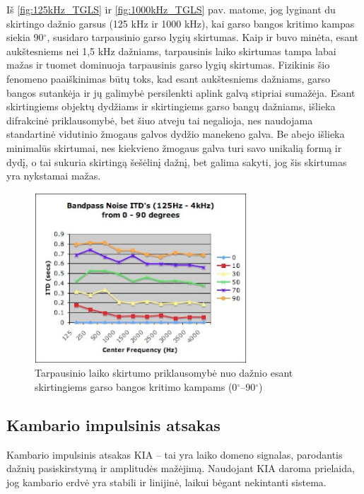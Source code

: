 \documentclass[]{vgtuef}
\begin{document}
Iš \ref{fig:125kHz_TGLS} ir \ref{fig:1000kHz_TGLS} pav. matome, jog lyginant du skirtingo dažnio garsus (125 kHz ir 1000 kHz), kai garso bangos kritimo kampas siekia 90$^\circ$, susidaro tarpausinio garso lygių skirtumas. Kaip ir buvo minėta, esant aukštesniems nei 1,5 kHz dažniams, tarpausinis laiko skirtumas tampa labai mažas ir tuomet dominuoja tarpausinis garso lygių skirtumas. Fizikinis šio fenomeno paaiškinimas būtų toks, kad esant aukštesniems dažniams, garso bangos sutankėja ir jų galimybė persilenkti aplink galvą stipriai sumažėja. Esant skirtingiems objektų dydžiams ir skirtingiems garso bangų dažniams, išlieka difrakcinė priklausomybė, bet šiuo atveju tai negalioja, nes naudojama standartinė vidutinio žmogaus galvos dydžio manekeno galva. Be abejo išlieka minimalūs skirtumai, nes kiekvieno žmogaus galva turi savo unikalią formą ir dydį, o tai sukuria skirtingą šešėlinį dažnį, bet galima sakyti, jog šis skirtumas yra nykstamai mažas.

\begin{figure}[!h]
  \centering
  \includegraphics[width=300px]{img/ITD_freq.png}
  \caption{Tarpausinio laiko skirtumo priklausomybė nuo dažnio esant skirtingiems garso bangos kritimo kampams (0$^\circ$--90$^\circ$)}
  \label{fig:ITD_freq}
\end{figure}


\subsection{Kambario impulsinis atsakas}
\label{sect:KIA}

Kambario impulsinis atsakas KIA – tai yra laiko domeno signalas, parodantis dažnių pasiskirstymą ir amplitudės mažėjimą. Naudojant KIA daroma prielaida, jog kambario erdvė yra stabili ir linijinė, laikui bėgant nekintanti sistema.
\end{document}
